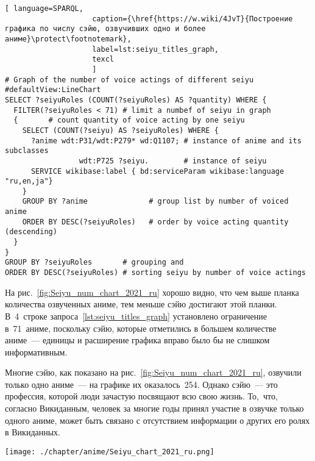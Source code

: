 \begin{lstlisting}[ language=SPARQL, 
                    caption={\href{https://w.wiki/4JvT}{Построение графика по числу сэйю, озвучивших одно и более аниме}\protect\footnotemark},
                    label=lst:seiyu_titles_graph,
                    texcl 
                    ]
# Graph of the number of voice actings of different seiyu
#defaultView:LineChart
SELECT ?seiyuRoles (COUNT(?seiyuRoles) AS ?quantity) WHERE {
  FILTER(?seiyuRoles < 71) # limit a numbef of seiyu in graph
  {       # count quantity of voice acting by one seiyu
    SELECT (COUNT(?seiyu) AS ?seiyuRoles) WHERE { 
      ?anime wdt:P31/wdt:P279* wd:Q1107; # instance of anime and its subclasses
                 wdt:P725 ?seiyu.        # instance of seiyu
      SERVICE wikibase:label { bd:serviceParam wikibase:language "ru,en,ja"}
    }
    GROUP BY ?anime              # group list by number of voiced anime
    ORDER BY DESC(?seiyuRoles)   # order by voice acting quantity (descending)
  }
}
GROUP BY ?seiyuRoles       # grouping and
ORDER BY DESC(?seiyuRoles) # sorting seiyu by number of voice actings
\end{lstlisting}%


На рис.~\ref{fig:Seiyu_num_chart_2021_ru} хорошо видно, 
что чем выше планка количества озвученных аниме, 
тем меньше сэйю достигают этой планки. 
В~4~строке запроса~\ref{lst:seiyu_titles_graph} установлено ограничение в~71~аниме, 
поскольку сэйю, которые отметились в большем количестве аниме~--- единицы и расширение графика вправо было бы не слишком информативным.

Многие сэйю, как показано на рис.~\ref{fig:Seiyu_num_chart_2021_ru}, 
озвучили только одно аниме~--- на графике их оказалось~254. 
Однако сэйю~--- это профессия, которой люди зачастую посвящают всю свою жизнь. 
То,~что, согласно Викиданным, человек за многие годы принял участие в озвучке только одного аниме, 
может быть связано с отсутствием информации о других его ролях в Викиданных. 

\begin{figure*}[h]
    \texttt{[image: ./chapter/anime/Seiyu\_chart\_2021\_ru.png]}%
	\caption[График числа ролей, озвученных различными сэйю, 2021 год.]{График числа ролей, озвученных различными сэйю, 2021 год. График построен на~основе данных, полученных с~помощью запроса~\protect\ref{lst:seiyu_titles_graph}}%
    \label{fig:Seiyu_num_chart_2021_ru}%
\end{figure*} 




